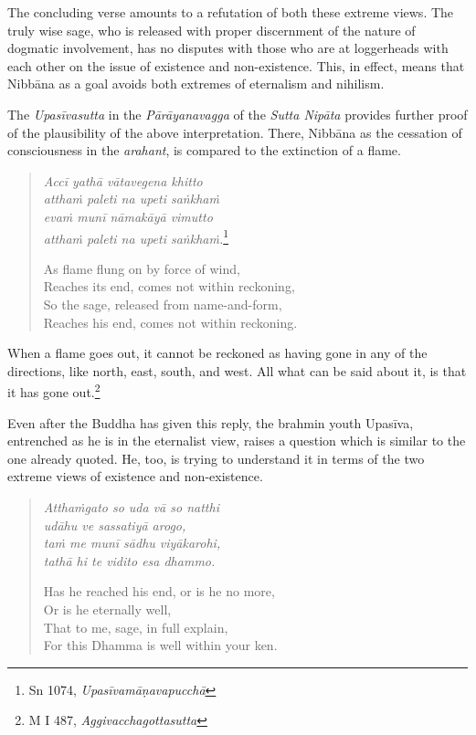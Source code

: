 The concluding verse amounts to a refutation of both these extreme views. The truly wise sage, who is released with proper discernment of the nature of dogmatic involvement, has no disputes with those who are at loggerheads with each other on the issue of existence and non-existence. This, in effect, means that Nibbāna as a goal avoids both extremes of eternalism and nihilism.

The \emph{Upasīvasutta} in the \emph{Pārāyanavagga} of the \emph{Sutta Nipāta} provides further proof of the plausibility of the above interpretation. There, Nibbāna as the cessation of consciousness in the \emph{arahant}, is compared to the extinction of a flame.

\begin{quote}
\emph{Accī yathā vātavegena khitto}\\
\emph{atthaṁ paleti na upeti saṅkhaṁ}\\
\emph{evaṁ munī nāmakāyā vimutto}\\
\emph{atthaṁ paleti na upeti saṅkhaṁ.}\footnote{Sn 1074, \emph{Upasīvamāṇavapucchā}}

\clearpage

As flame flung on by force of wind,\\
Reaches its end, comes not within reckoning,\\
So the sage, released from name-and-form,\\
Reaches his end, comes not within reckoning.
\end{quote}

When a flame goes out, it cannot be reckoned as having gone in any of the directions, like north, east, south, and west. All what can be said about it, is that it has gone out.\footnote{M I 487, \emph{Aggivacchagottasutta}}

Even after the Buddha has given this reply, the brahmin youth Upasīva, entrenched as he is in the eternalist view, raises a question which is similar to the one already quoted. He, too, is trying to understand it in terms of the two extreme views of existence and non-existence.

\begin{quote}
\emph{Atthaṁgato so uda vā so natthi}\\
\emph{udāhu ve sassatiyā arogo,}\\
\emph{taṁ me munī sādhu viyākarohi,}\\
\emph{tathā hi te vidito esa dhammo.}

Has he reached his end, or is he no more,\\
Or is he eternally well,\\
That to me, sage, in full explain,\\
For this Dhamma is well within your ken.
\end{quote}

